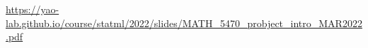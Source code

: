 \documentclass[11pt]{article}
\begin{document}
\noindent \url{https://yao-lab.github.io/course/statml/2022/slides/MATH\_5470\_probject\_intro\_MAR2022.pdf}


%
%
\end{document}
